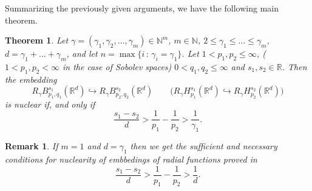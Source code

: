 \documentclass[12pt]{article}
\newtheorem{T}{Theorem}
\newtheorem{Rem}{Remark}
\newcommand{\R}{{\mathbb R}}
\newcommand{\N}{{\mathbb N}}
\begin{document}
Summarizing the previously given arguments, we have the following main theorem.
\begin{T} \label{main2function}
	Let $\gamma= (\gamma_1 , \gamma_2, \ldots , \gamma_m)\in \N^m$, $m\in \N$,   $2\le \gamma_1\le \ldots \le \gamma_m$, %
	$d= \gamma_1+ \ldots + \gamma_m$, and let $n = \max\{ i\,:\, \gamma_i=\gamma_1\}$. 	
	Let $1< p_1,p_2\le\infty$, ($1<p_1, p_2<\infty$ in the case of Sobolev spaces)  $0<q_1,q_2\le \infty$ and  $s_1,s_2\in \R$. Then the embedding 
	\begin{equation*}
R_\gamma B^{s_1}_{p_1,q_1}(\R^d) \hookrightarrow R_\gamma B^{s_2}_{p_2,q_2}(\R^d)
\qquad \bigg(R_\gamma H^{s_1}_{p_1}(\R^d) \hookrightarrow R_\gamma H^{s_2}_{p_2}(\R^d)\bigg)
	\end{equation*}
	is nuclear if, and only if
	$$
\frac{	s_1-s_2}{d}>\frac{1}{p_1}-\frac{1}{p_2}> \frac{1}{ \gamma_{1}}. 
	$$
\end{T}
\begin{Rem}
	\rm{If $m=1$ and $d=\gamma_1$ then we  get the sufficient and necessary conditions for nuclearity of embbedings of radial functions proved in \cite{HS2}
		$$
	\frac{	s_1-s_2}{d}>\frac{1}{p_1}-\frac{1}{p_2}> \frac{1}{d}. 
	$$
 }
\end{Rem}



	
	

		
		
		
		
		
		
	
	
\end{document}
